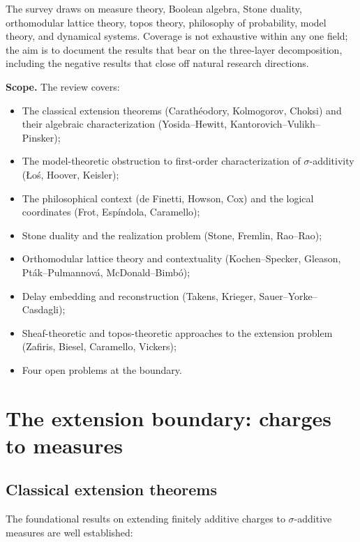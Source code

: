 The survey draws on measure theory, Boolean algebra, Stone duality,
orthomodular lattice theory, topos theory, philosophy of
probability, model theory, and dynamical systems.  Coverage is not
exhaustive within any one field; the aim is to document the results
that bear on the three-layer decomposition, including the negative
results that close off natural research directions.

\medskip\noindent
\textbf{Scope.}  The review covers:
\begin{itemize}[nosep]
  \item The classical extension theorems (Carath\'{e}odory,
    Kolmogorov, Choksi) and their algebraic characterization
    (Yosida--Hewitt, Kantorovich--Vulikh--Pinsker);
  \item The model-theoretic obstruction to first-order
    characterization of $\sigma$-additivity
    (\L{}o\'{s}, Hoover, Keisler);
  \item The philosophical context (de Finetti, Howson, Cox) and the
    logical coordinates (Frot, Esp\'{i}ndola, Caramello);
  \item Stone duality and the realization problem
    (Stone, Fremlin, Rao--Rao);
  \item Orthomodular lattice theory and contextuality
    (Kochen--Specker, Gleason, Pt\'{a}k--Pulmannov\'{a},
    McDonald--Bimb\'{o});
  \item Delay embedding and reconstruction
    (Takens, Krieger, Sauer--Yorke--Casdagli);
  \item Sheaf-theoretic and topos-theoretic approaches to the
    extension problem (Zafiris, Biesel, Caramello, Vickers);
  \item Four open problems at the boundary.
\end{itemize}

\section{The extension boundary: charges to measures}
\label{sec:extension}

\subsection{Classical extension theorems}

The foundational results on extending finitely additive charges to
$\sigma$-additive measures are well established:

